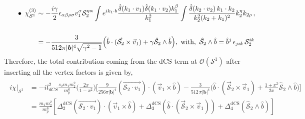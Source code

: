 \begin{align}
\begin{split}
\hspace{0.7 cm} \bullet \,\,\, \chi_{\mathcal{S}^1}^{(3)}&\sim -\frac{i \gamma}{2}\epsilon_{\alpha\beta \rho\sigma}v_1^\sigma \mathcal{S}_2^{\eta\alpha}\int e^{ik_1\cdot b}\frac{\hat\delta(k_1\cdot v_1)\hat\delta(k_1\cdot v_2)k_1^\beta}{k_1^2}\int \frac{\hat\delta(k_2\cdot v_2)\,k_1\cdot k_2}{k_2^2(k_2+k_1)^2}k_2^\eta k_{2\rho}\,,\\ &
 \\ &=-\frac{3}{512 \pi|\boldsymbol{b}|^4\sqrt{\gamma^2-1}}\Big(\hat b\cdot (\vec{\mathcal{S}}_2\times \vec v_1)+\gamma \hat{\mathcal{S}}_2\wedge \hat b\Big),\,\,\textrm{with},\,\,\hat{\mathcal{S}}_2\wedge \hat b=\hat b^j\,\epsilon_{jik}\,\mathcal{S}_2^{ik}
      \label{3.81}
    \end{split}
\end{align}
  Therefore, the total contribution coming from the dCS term at $\mathcal{O}(\mathcal{S}^1)$ after inserting all the vertex factors is given by,
\begin{align}
    \begin{split}
 \hspace{0cm}i\chi\Big|_{\mathcal{S}^1}&=-il_{dCS} ^2\frac{s_2m_1 m_2^2}{m_p^6}\Bigg(\frac{2x}{1-x^2}\Bigg)\Bigg[\frac{9}{256 \pi |\boldsymbol{b}|^4} (\overrightarrow{\mathcal{S}_2\cdot v_1})\cdot (\vec v_1\times \hat b)-\frac{3}{512\,\pi |\boldsymbol{b}|^4}\Big(\hat b\cdot (\vec{\mathcal{S}}_2\times \vec v_1)+\frac{1+x^2}{2x} \hat{\mathcal{S}}_2\wedge \hat b\Big)\Bigg]\\ &
 =
 \frac{m_1 m_2^2}{m_p^6}\left[\Delta_{\mathfrak{2}}^{\textrm{dCS}}(\overrightarrow{\mathcal{S}_2\cdot v_1})\cdot (\vec v_1\times \hat b)+\Delta_{\mathfrak{3}}^{\textrm{dCS}}\left(\hat b\cdot \left(\vec{\mathcal{S}}_2\times \vec v_1\right)\right)+\Delta_{\mathfrak{4}}^{\textrm{dCS}}\left(\hat{\mathcal{S}}_2\wedge \hat b\right)\right]
    \end{split} \label{eqt24} 
\end{align}
